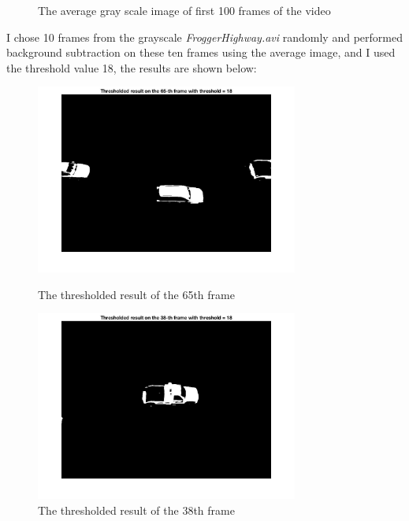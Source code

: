 \documentclass[a4paper]{article}
\begin{document}
\begin{spacing}{2.0}
\begin{enumerate}
\begin{figure}[H]
		\caption{The average gray scale image of first 100 frames of the video} 
	\end{figure}
	I chose 10 frames from the grayscale \emph{FroggerHighway.avi} randomly and performed background subtraction on these ten frames using the average image, and I used the threshold value 18, the results are shown below: 
	\begin{figure}[H]
	    \begin{minipage}[t]{0.5\textwidth}
	        \centering
	        \includegraphics[width=3.4in]{2_1.jpg}
	        \caption{The thresholded result of the 65th frame}
	        \label{fig:side:a}
	    \end{minipage}%
	  \begin{minipage}[t]{0.5\textwidth}
	      \centering
	      \includegraphics[width=3.4in]{2_2.jpg}
	      \caption{The thresholded result of the 38th frame}
	      \label{fig:side:b}
	    \end{minipage}
	\end{figure}
	

\end{enumerate}
\end{spacing}
\end{document}
